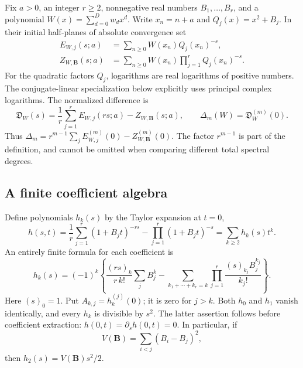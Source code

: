 \documentclass[11pt,a4paper]{article}
\numberwithin{equation}{section}
\theoremstyle{plain}
\theoremstyle{definition}
\theoremstyle{remark}
\begin{document}
Fix $a>0$, an integer $r\ge2$, nonnegative real numbers
$B_1,\ldots,B_r$, and a polynomial
$W(x)=\sum_{d=0}^{D}w_dx^d$.  Write $x_n=n+a$ and
$Q_j(x)=x^2+B_j$.  In their initial half-planes of absolute convergence set
\begin{align}
 E_{W,j}(s;a)&=\sum_{n\ge0}W(x_n)Q_j(x_n)^{-s},\\
 Z_{W,\boldsymbol B}(s;a)&=
       \sum_{n\ge0}W(x_n)\prod_{j=1}^rQ_j(x_n)^{-s}.
\end{align}
For the quadratic factors $Q_j$, logarithms are real logarithms of
positive numbers.  The conjugate-linear specialization below explicitly
uses principal complex logarithms.
The normalized difference is
\begin{equation}\label{one:defect}
 \mathfrak D_W(s)=\frac1r\sum_{j=1}^rE_{W,j}(rs;a)
                         -Z_{W,\boldsymbol B}(s;a),\qquad
 \Delta_m(W)=\mathfrak D_W^{(m)}(0).
\end{equation}
Thus $\Delta_m=r^{m-1}\sum_jE_{W,j}^{(m)}(0)-Z_{W,\boldsymbol B}^{(m)}(0)$.
The factor $r^{m-1}$ is part of the definition, and cannot be omitted
when comparing different total spectral degrees.

\subsection{A finite coefficient algebra}
Define polynomials $h_k(s)$ by the Taylor expansion at $t=0$,
\begin{equation}\label{one:h}
 h(s,t)=\frac1r\sum_{j=1}^r(1+B_jt)^{-rs}
                -\prod_{j=1}^r(1+B_jt)^{-s}
       =\sum_{k\ge2}h_k(s)t^k.
\end{equation}
An entirely finite formula for each coefficient is
\begin{equation}\label{one:hk}
 h_k(s)=(-1)^k\left\{
 \frac{(rs)_k}{r\,k!}\sum_jB_j^k
 -\sum_{k_1+\cdots+k_r=k}
                \prod_{j=1}^r\frac{(s)_{k_j}B_j^{k_j}}{k_j!}
                  \right\}.
\end{equation}
Here $(s)_0=1$.  Put $A_{k,j}=h_k^{(j)}(0)$; it is zero for $j>k$.
Both $h_0$ and $h_1$ vanish identically, and every $h_k$ is divisible
by $s^2$.  The latter assertion follows before coefficient extraction:
$h(0,t)=\partial_sh(0,t)=0$.  In particular, if
\begin{equation}\label{one:variance}
 V(\boldsymbol B)=\sum_{i<j}(B_i-B_j)^2,
\end{equation}
then $h_2(s)=V(\boldsymbol B)s^2/2$.
\end{document}
